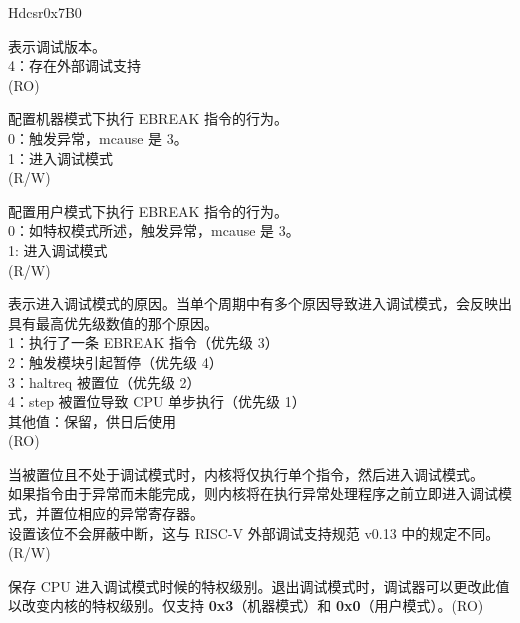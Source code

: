 \begin{register}{H}{dcsr}{0x7B0}\label{regdesc:LPDCSR}
%
%
%
%
%
%
%
%
%
%
\regnewline%
\begin{regdesc}\begin{reglist}
\label{xdebugver}\item [xdebugver] 表示调试版本。\\
4：存在外部调试支持\\
(RO)
\label{ebreakm}\item [ebreakm] 配置机器模式下执行 EBREAK 指令的行为。\\
0：触发异常，mcause 是 3。\\
1：进入调试模式\\
(R/W)
\label{ebreaku}\item [ebreaku] 配置用户模式下执行 EBREAK 指令的行为。\\
0：如特权模式所述，触发异常，mcause 是 3。\\
1: 进入调试模式\\
(R/W)
\label{cause}\item [cause] 表示进入调试模式的原因。当单个周期中有多个原因导致进入调试模式，会反映出具有最高优先级数值的那个原因。\\
1：执行了一条 EBREAK 指令（优先级 3）\\
2：触发模块引起暂停（优先级 4）\\
3：haltreq 被置位（优先级 2）\\
4：step 被置位导致 CPU 单步执行（优先级 1）\\
其他值：保留，供日后使用\\
(RO)
\label{step}\item [step] 当被置位且不处于调试模式时，内核将仅执行单个指令，然后进入调试模式。\\
如果指令由于异常而未能完成，则内核将在执行异常处理程序之前立即进入调试模式，并置位相应的异常寄存器。\\
设置该位不会屏蔽中断，这与 RISC-V 外部调试支持规范 v0.13 中的规定不同。\\(R/W)
\label{prv}\item [prv] 保存 CPU 进入调试模式时候的特权级别。退出调试模式时，调试器可以更改此值以改变内核的特权级别。仅支持 \textbf{0x3}（机器模式）和 \textbf{0x0}（用户模式）。(RO)
\end{reglist}\end{regdesc}
\end{register}

